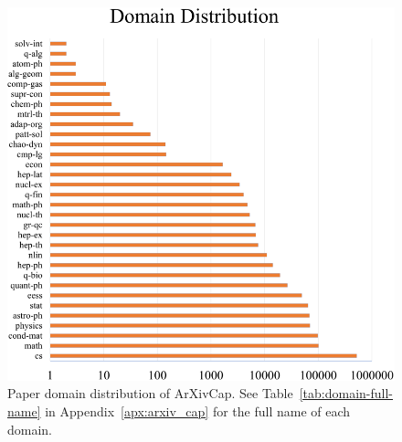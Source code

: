 \begin{figure}[t!]
    \centering
    \includegraphics[width=0.9\linewidth]{figs/domain-distribution_500.png}
    \caption{Paper domain distribution of ArXivCap. See Table~\ref{tab:domain-full-name} in Appendix~\ref{apx:arxiv_cap} for the full name of each domain.}
    \label{fig:domain-distribution}
\end{figure}
